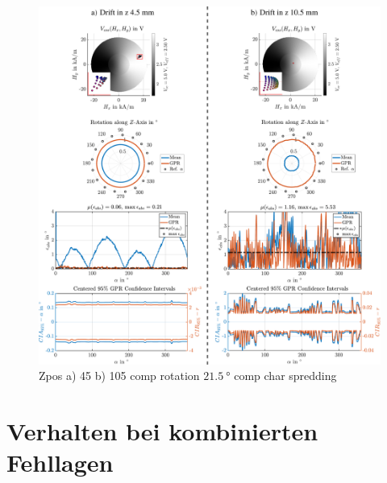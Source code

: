 \begin{figure}[tbph]
	\centering
	\includegraphics[width=\linewidth]{appendix/images/8-Ergebnisse-Experimente/Z-Pos-Comp-45-105-Rotation}
	\caption[Zpos 45 105 comp rotation]{Zpos a) 45 b) 105 comp rotation $\SI{21,5}{\degree}$ comp char spredding}
	\label{fig:z-pos-comp-45-105-rotation}
\end{figure}



\clearpage


\section{Verhalten bei kombinierten Fehllagen}\label{sec:ergexp6}

